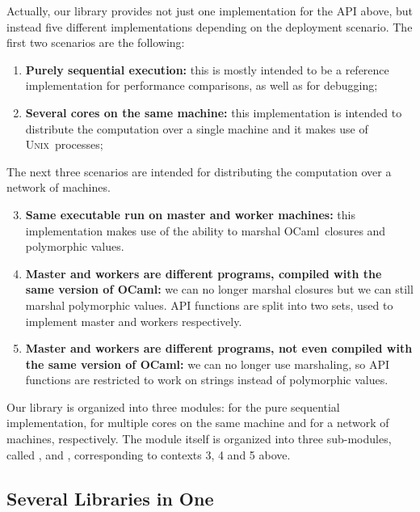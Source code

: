 \documentclass{llncs}
\newcommand{\Ocaml}{OCaml}
\newcommand{\unix}{\textsc{Unix}}
\begin{document}
Actually, our library provides not just one implementation for the API above,
but instead five different implementations
depending on the deployment scenario. 
The first two scenarios are the following: 
\begin{enumerate}
\item \textbf{Purely sequential execution:}
  this is mostly intended to be a reference implementation
  for performance comparisons, as well as for debugging;

\item \textbf{Several cores on the same machine:} 
  this implementation is intended to distribute the computation over a
  single machine and it makes use of \unix\ processes;
\end{enumerate}
The next three scenarios are intended for distributing the
computation over a network of machines.
\begin{enumerate}
\setcounter{enumi}{2}
\item \textbf{Same executable run on master and worker machines:}
  this implementation makes use of the ability to marshal \Ocaml\
  closures and polymorphic values.

\item \textbf{Master and workers are different programs, compiled with
    the same version of \Ocaml:} 
  we can no longer marshal closures but we can still
  marshal polymorphic values. API functions are split into two sets,
  used to implement master and workers respectively.

\item \textbf{Master and workers are different programs, not even
    compiled with the same version of \Ocaml:} we can no
  longer use marshaling, so API functions are restricted to work on
  strings instead of polymorphic values.
\end{enumerate}
Our library is organized into three modules:  for the
pure sequential implementation, \of{Cores} for multiple cores on the
same machine and  for a network of machines, respectively.
The \of{Network} module itself is organized into three sub-modules,
called \of{Same}, \of{Poly} and \of{Mono},
corresponding to contexts 3, 4 and 5 above. 

\subsection{Several Libraries in One}
\end{document}
